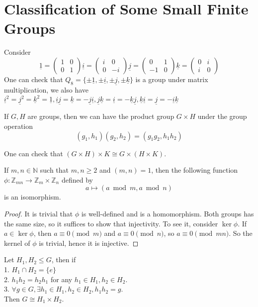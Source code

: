 \section{Classification of Some Small Finite Groups}
Consider
$$\underline{1}=
\begin{pmatrix}
    1&0\\
    0&1
\end{pmatrix}
\underline{i}=
\begin{pmatrix}
    i&0\\
    0&-i
\end{pmatrix}
\underline{j}=
\begin{pmatrix}
    0&1\\
    -1&0
\end{pmatrix}
\underline{k}=
\begin{pmatrix}
    0&i\\
    i&0
\end{pmatrix}
$$
One can check that
$Q_8=\{\pm\underline{1},\pm\underline{i},\pm\underline{j},\pm\underline{k}\}$ is a group under matrix multiplication, we also have $\underline{i}^2=\underline{j}^2=\underline{k}^2=\underline{1},\underline{i}\underline{j}=\underline{k}=-\underline{j}\underline{i},\underline{j}\underline{k}=\underline{i}=-\underline{k}\underline{j},\underline{k}\underline{i}=\underline{j}=-\underline{i}\underline{k}$
\begin{definition}
    If $G,H$ are groups, then we can have the product group $G\times H$ under the group operation
    $$(g_1,h_1)(g_2,h_2)=(g_1g_2,h_1h_2)$$
\end{definition}
One can check that $(G\times H)\times K\cong G\times (H\times K)$.
\begin{theorem}\label{crt}
    If $m,n\in\mathbb N$ such that $m,n\ge 2$ and $(m,n)=1$, then the following function $\phi: \mathbb Z_{mn}\to\mathbb Z_m\times\mathbb Z_n$ defined by
    $$a\mapsto (a\bmod m,a\bmod n)$$
    is an isomorphism.
\end{theorem}
\begin{proof}
    It is trivial that $\phi$ is well-defined and is a homomorphism.
    Both groups has the same size, so it suffices to show that injectivity.
    To see it, consider $\ker\phi$.
    If $a\in\ker\phi$, then $a\equiv 0\pmod{m}$ and $a\equiv 0\pmod{n}$, so $a\equiv 0\pmod{mn}$.
    So the kernel of $\phi$ is trivial, hence it is injective.
\end{proof}
\begin{theorem}\label{direct_product_thm}
    Let $H_1,H_2\le G$, then if\\
    1. $H_1\cap H_2=\{e\}$\\
    2. $h_1h_2=h_2h_1$ for any $h_1\in H_1,h_2\in H_2$.\\
    3. $\forall g\in G,\exists h_1\in H_1, h_2\in H_2, h_1h_2=g$.\\
    Then $G\cong H_1\times H_2$.
\end{theorem}
